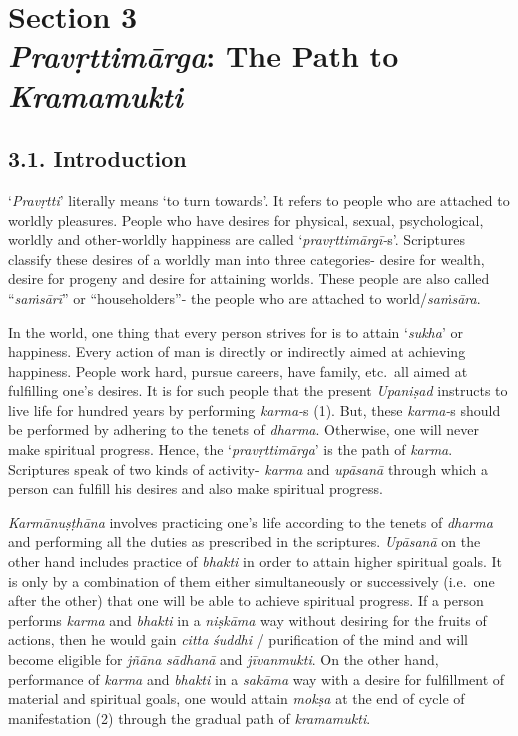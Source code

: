 \chapter[Section 3 \emph{Pravṛttimārga}: The Path to \emph{Kramamukti}]{Section 3\\ \emph{Pravṛttimārga}: The Path to \emph{Kramamukti}}

\section*{3.1. Introduction}

`\emph{Pravṛtti}' literally means `to turn towards'. It refers to people who are attached to worldly pleasures. People who have desires for physical, sexual, psychological, worldly and other-worldly happiness are called `\emph{pravṛttimārgī-}s'. Scriptures classify these desires of a worldly man into three categories- desire for wealth, desire for progeny and desire for attaining worlds. These people are also called ``\emph{saṁsārī}'' or ``householders''- the people who are attached to world/\emph{saṁsāra}.

In the world, one thing that every person strives for is to attain `\emph{sukha}' or happiness. Every action of man is directly or indirectly aimed at achieving happiness. People work hard, pursue careers, have family, etc.\ all aimed at fulfilling one's desires. It is for such people that the present \emph{Upaniṣad} instructs to live life for hundred years by performing \emph{karma-}s (1). But, these \emph{karma-}s should be performed by adhering to the tenets of \emph{dharma}. Otherwise, one will never make spiritual progress. Hence, the `\emph{pravṛttimārga}' is the path of \emph{karma}. Scriptures speak of two kinds of activity- \emph{karma} and \emph{upāsanā} through which a person can fulfill his desires and also make spiritual progress.

\emph{Karmānuṣṭhāna} involves practicing one's life according to the tenets of \emph{dharma} and performing all the duties as prescribed in the scriptures. \emph{Upāsanā} on the other hand includes practice of \emph{bhakti} in order to attain higher spiritual goals. It is only by a combination of them either simultaneously or successively (i.e.\ one after the other) that one will be able to achieve spiritual progress. If a person performs \emph{karma} and \emph{bhakti} in a \emph{niṣkāma} way without desiring for the fruits of actions, then he would gain \emph{citta} \emph{śuddhi} / purification of the mind and will become eligible for \emph{jñāna} \emph{sādhanā} and \emph{jīvanmukti}. On the other hand, performance of \emph{karma} and \emph{bhakti} in a \emph{sakāma} way with a desire for fulfillment of material and spiritual goals, one would attain \emph{mokṣa} at the end of cycle of manifestation (2) through the gradual path of \emph{kramamukti}.

